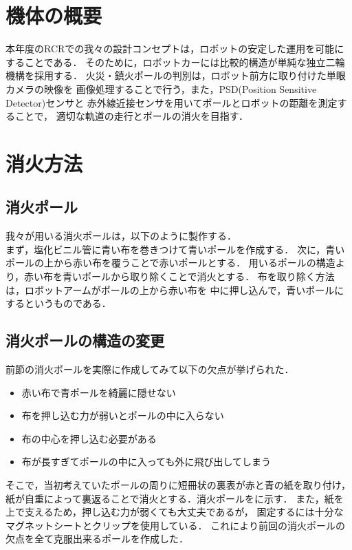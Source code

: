 \documentclass[11pt,a4]{jsarticle}
\begin{document}

\section{機体の概要}  %

  本年度のRCRでの我々の設計コンセプトは，ロボットの安定した運用を可能にすることである．
  そのために，ロボットカーには比較的構造が単純な独立二輪機構を採用する．
  火災・鎮火ポールの判別は，ロボット前方に取り付けた単眼カメラの映像を
  画像処理することで行う，また，PSD(Position Sensitive Detector)センサと
  赤外線近接センサを用いてポールとロボットの距離を測定することで，
  適切な軌道の走行とポールの消火を目指す．

\section{消火方法}  %

  \subsection{消火ポール}
    我々が用いる消火ポールは，以下のように製作する．\\
    まず，塩化ビニル管に青い布を巻きつけて青いポールを作成する．
    次に，青いポールの上から赤い布を覆うことで赤いポールとする．
    用いるポールの構造より，赤い布を青いポールから取り除くことで消火とする．
    布を取り除く方法は，ロボットアームがポールの上から赤い布を
    中に押し込んで，青いポールにするというものである．

  \subsection{消火ポールの構造の変更}
    前節の消火ポールを実際に作成してみて以下の欠点が挙げられた．
    \begin{itemize}
      \item 赤い布で青ポールを綺麗に隠せない
      \item 布を押し込む力が弱いとポールの中に入らない
      \item 布の中心を押し込む必要がある
      \item 布が長すぎてポールの中に入っても外に飛び出してしまう
    \end{itemize}
    そこで，当初考えていたポールの周りに短冊状の裏表が赤と青の紙を取り付け，
    紙が自重によって裏返ることで消火とする．消火ポールをに示す．
    また，紙を上で支えるため，押し込む力が弱くても大丈夫であるが，
    固定するには十分なマグネットシートとクリップを使用している．
    これにより前回の消火ポールの欠点を全て克服出来るポールを作成した．
\end{document}
